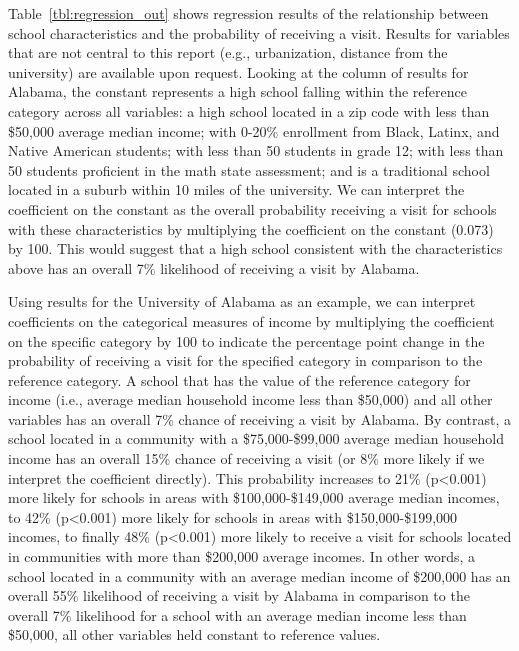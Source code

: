 \documentclass[twoside]{article}
\begin{document}

Table~\ref{tbl:regression_out} shows regression results of the relationship between school characteristics and the probability of receiving a visit. Results for variables that are not central to this report (e.g., urbanization, distance from the university) are available upon request. Looking at the column of results for Alabama, the constant represents a high school falling within the reference category across all variables: a high school located in a zip code with less than \$50,000 average median income; with 0-20\% enrollment from Black, Latinx, and Native American students; with less than 50 students in grade 12; with less than 50 students proficient in the math state assessment; and is a traditional school located in a suburb within 10 miles of the university. We can interpret the coefficient on the constant as the overall probability receiving a visit for schools with these characteristics by multiplying the coefficient on the constant (0.073) by 100. This would suggest that a high school consistent with the characteristics above has an overall 7\% likelihood of receiving a visit by Alabama.


Using results for the University of Alabama as an example, we can interpret coefficients on the categorical measures of income by multiplying the coefficient on the specific category by 100 to indicate the percentage point change in the probability of receiving a visit for the specified category in comparison to the reference category. A school that has the value of the reference category for income (i.e., average median household income less than \$50,000) and all other variables has an overall 7\% chance of receiving a visit by Alabama. By contrast, a school located in a community with a \$75,000-\$99,000 average median household income has an overall 15\% chance of receiving a visit (or 8\% more likely if we interpret the coefficient directly). This probability increases to 21\% (p<0.001) more likely for schools in areas with \$100,000-\$149,000 average median incomes, to 42\% (p<0.001) more likely for schools in areas with \$150,000-\$199,000 incomes, to finally 48\% (p<0.001) more likely to receive a visit for schools located in communities with more than \$200,000 average incomes. In other words, a school located in a community with an average median income of \$200,000 has an overall 55\% likelihood of receiving a visit by Alabama in comparison to the overall 7\% likelihood for a school with an average median income less than \$50,000, all other variables held constant to reference values.
\end{document}
